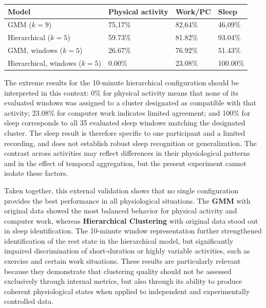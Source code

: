 \documentclass[a4paper,fleqn]{cas-sc}
\newcommand{\newtextred}[1]{{\color{yellow!65!black}#1}}
\begin{document}
\begin{center}
\label{tab:external_validation}
\small
\begin{tabular*}{.95\textwidth}{@{} p{.34\linewidth} p{.18\linewidth} p{.18\linewidth} p{.16\linewidth} @{}}
\toprule
\textbf{Model} & \textbf{Physical activity} & \textbf{Work/PC} & \textbf{Sleep} \\
\midrule
GMM ($k=9$) & 75,17\% & 82,64\% & 46,09\% \\
Hierarchical ($k=5$) & 59.73\% & 81.82\% & 93.04\% \\
GMM, windows ($k=5$) & 26.67\% & 76.92\% & 51.43\% \\
Hierarchical, windows ($k=5$) & 0.00\% & 23.08\% & 100.00\% \\
\bottomrule
\end{tabular*}
\end{center}

\newtextred{The extreme results for the 10-minute hierarchical configuration should be interpreted in this context: 0\% for physical activity means that none of its evaluated windows was assigned to a cluster designated as compatible with that activity; 23.08\% for computer work indicates limited agreement; and 100\% for sleep corresponds to all 35 evaluated sleep windows matching the designated cluster. The sleep result is therefore specific to one participant and a limited recording, and does not establish robust sleep recognition or generalization. The contrast across activities may reflect differences in their physiological patterns and in the effect of temporal aggregation, but the present experiment cannot isolate these factors.}

Taken together, this external validation shows that no single configuration provides the best performance in all physiological situations. The \textbf{GMM} with original data showed the most balanced behavior for physical activity and computer work, whereas \textbf{Hierarchical Clustering} with original data stood out in sleep identification. The 10-minute window representation further strengthened identification of the rest state in the hierarchical model, but significantly impaired discrimination of short-duration or highly variable activities, such as exercise and certain work situations. These results are particularly relevant because they demonstrate that clustering quality should not be assessed exclusively through internal metrics, but also through its ability to produce coherent physiological states when applied to independent and experimentally controlled data.
\end{document}
